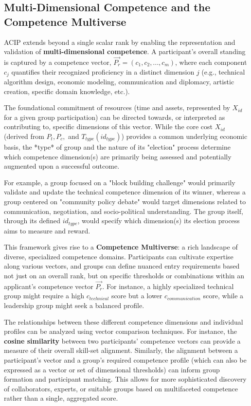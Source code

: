 \documentclass{article}
\begin{document}
\begin{CJK}{UTF8}{gbsn}
        \subsection{Multi-Dimensional Competence and the Competence Multiverse}
        \label{sec:multi_dimensional_competence}

        ACIP extends beyond a single scalar rank by enabling the representation and validation of \textbf{multi-dimensional competence}. A participant's overall standing is captured by a competence vector, $\vec{P_r} = (c_1, c_2, ..., c_m)$, where each component $c_j$ quantifies their recognized proficiency in a distinct dimension $j$ (e.g., technical algorithm design, economic modeling, communication and diplomacy, artistic creation, specific domain knowledge, etc.).

        The foundational commitment of resources (time and assets, represented by $X_{id}$ for a given group participation) can be directed towards, or interpreted as contributing to, specific dimensions of this vector. While the core cost $X_{id}$ (derived from $P_t, P_c,$ and $T_{type}(id_{type})$) provides a common underlying economic basis, the *type* of group and the nature of its "election" process determine which competence dimension(s) are primarily being assessed and potentially augmented upon a successful outcome.

        For example, a group focused on a "block building challenge" would primarily validate and update the technical competence dimension of its winner, whereas a group centered on "community policy debate" would target dimensions related to communication, negotiation, and socio-political understanding. The group itself, through its defined $id_{type}$, would specify which dimension(s) its election process aims to measure and reward.

        This framework gives rise to a \textbf{Competence Multiverse}: a rich landscape of diverse, specialized competence domains. Participants can cultivate expertise along various vectors, and groups can define nuanced entry requirements based not just on an overall rank, but on specific thresholds or combinations within an applicant's competence vector $\vec{P_r}$. For instance, a highly specialized technical group might require a high $c_{technical}$ score but a lower $c_{communication}$ score, while a leadership group might seek a balanced profile.

        The relationships between these different competence dimensions and individual profiles can be analyzed using vector comparison techniques. For instance, the \textbf{cosine similarity} between two participants' competence vectors can provide a measure of their overall skill-set alignment. Similarly, the alignment between a participant's vector and a group's required competence profile (which can also be expressed as a vector or set of dimensional thresholds) can inform group formation and participant matching. This allows for more sophisticated discovery of collaborators, experts, or suitable groups based on multifaceted competence rather than a single, aggregated score.


\end{CJK}
\end{document}
